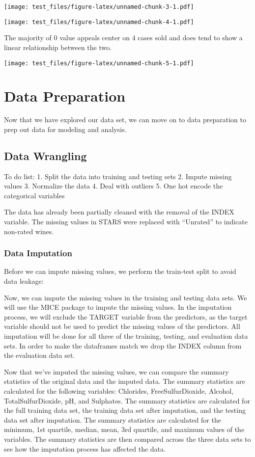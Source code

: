 \documentclass[
]{article}
\begin{document}
\texttt{[image: test\_files/figure-latex/unnamed-chunk-3-1.pdf]}

\texttt{[image: test\_files/figure-latex/unnamed-chunk-4-1.pdf]}

The majority of 0 value appeals center on 4 cases sold and does tend to
show a linear relationship between the two. \newline

\texttt{[image: test\_files/figure-latex/unnamed-chunk-5-1.pdf]}

\section{Data Preparation}\label{data-preparation}

Now that we have explored our data set, we can move on to data
preparation to prep out data for modeling and analysis.

\subsection{Data Wrangling}\label{data-wrangling}

To do list: 1. Split the data into training and testing sets 2. Impute
missing values 3. Normalize the data 4. Deal with outliers 5. One hot
encode the categorical variables

The data has already been partially cleaned with the removal of the
INDEX variable. The missing values in STARS were replaced with
``Unrated'' to indicate non-rated wines.

\subsubsection{Data Imputation}\label{data-imputation}

Before we can impute missing values, we perform the train-test split to
avoid data leakage:

Now, we can impute the missing values in the training and testing data
sets. We will use the MICE package to impute the missing values. In the
imputation process, we will exclude the TARGET variable from the
predictors, as the target variable should not be used to predict the
missing values of the predictors. All imputation will be done for all
three of the training, testing, and evaluation data sets. In order to
make the dataframes match we drop the INDEX column from the evaluation
data set.

Now that we've imputed the missing values, we can compare the summary
statistics of the original data and the imputed data. The summary
statistics are calculated for the following variables: Chlorides,
FreeSulfurDioxide, Alcohol, TotalSulfurDioxide, pH, and Sulphates. The
summary statistics are calculated for the full training data set, the
training data set after imputation, and the testing data set after
imputation. The summary statistics are calculated for the minimum, 1st
quartile, median, mean, 3rd quartile, and maximum values of the
variables. The summary statistics are then compared across the three
data sets to see how the imputation process has affected the data.
\end{document}
